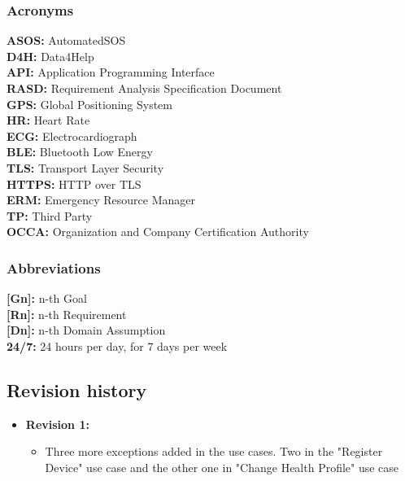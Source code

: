 \begin{flushleft}
\paragraph{}

{\color{Blue}\subsubsection{Acronyms}}
\textbf{ASOS:} AutomatedSOS\\
\textbf{D4H:} Data4Help\\
\textbf{API:} Application Programming Interface\\
\textbf{RASD:} Requirement Analysis Specification Document \\
\textbf{GPS:} Global Positioning System\\
\textbf{HR:} Heart Rate\\
\textbf{ECG:} Electrocardiograph\\
\textbf{BLE:} Bluetooth Low Energy\\
\textbf{TLS:} Transport Layer Security\\
\textbf{HTTPS:} HTTP over TLS\\
\textbf{ERM:} Emergency Resource Manager\\
\textbf{TP:} Third Party\\
\textbf{OCCA:} Organization and Company Certification Authority\\
\paragraph{}

{\color{Blue}\subsubsection{Abbreviations}}
\textbf{[Gn]:} n-th Goal\\
\textbf{[Rn]:} n-th Requirement\\
\textbf{[Dn]:} n-th Domain Assumption\\
\textbf{24/7:} 24 hours per day, for 7 days per week \\
\paragraph{}

{\color{Blue}\subsection{Revision history}}
\begin{itemize}
\item \textbf{Revision 1:}\begin{itemize}
	\item Three more exceptions added in the use cases. Two in the "Register Device" use case and the other one in "Change Health Profile" use case


\end{itemize}
\end{itemize}
\end{flushleft}
